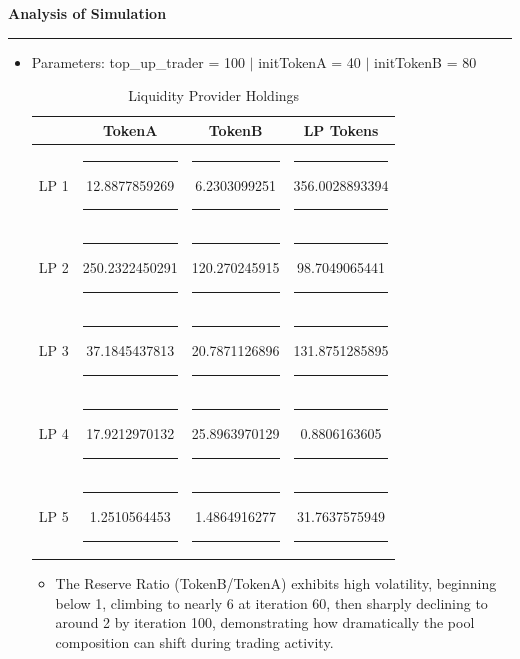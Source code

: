 \documentclass[a4paper]{article}
\newenvironment{solution}[2][]{%
\begin{mdframed}[linecolor=blue!70!black, linewidth=2pt, roundcorner=10pt, backgroundcolor=yellow!10!white, skipabove=12pt, skipbelow=12pt]%
	\textbf{\large #2}
	\par\noindent\rule{\textwidth}{0.4pt}
}{
\end{mdframed}
}
\begin{document}
\begin{solution}{Analysis of Simulation}
\begin{itemize}
\item Parameters: top\_up\_trader = 100 $|$ initTokenA = 40 $|$ initTokenB = 80 
\begin{figure}[H]
   \centering
\end{figure}

\begin{table}[H]
	\centering
	\begin{tabular}{|c|c|c|c|}
	\hline
	\textbf{\rule{0pt}{1.2em}Liquidity Provider} & \textbf{TokenA} & \textbf{TokenB} & \textbf{LP Tokens} \\ \hline
	LP 1 & \rule{0.5em}{0pt}12.8877859269\rule{0.5em}{0pt} & \rule{0.5em}{0pt}6.2303099251\rule{0.5em}{0pt} & \rule{0.5em}{0pt}356.0028893394\rule{0.5em}{0pt} \\ \hline
	LP 2 & \rule{0.5em}{0pt}250.2322450291\rule{0.5em}{0pt} & \rule{0.5em}{0pt}120.270245915\rule{0.5em}{0pt} & \rule{0.5em}{0pt}98.7049065441\rule{0.5em}{0pt} \\ \hline
	LP 3 & \rule{0.5em}{0pt}37.1845437813\rule{0.5em}{0pt} & \rule{0.5em}{0pt}20.7871126896\rule{0.5em}{0pt} & \rule{0.5em}{0pt}131.8751285895\rule{0.5em}{0pt} \\ \hline
	LP 4 & \rule{0.5em}{0pt}17.9212970132\rule{0.5em}{0pt} & \rule{0.5em}{0pt}25.8963970129\rule{0.5em}{0pt} & \rule{0.5em}{0pt}0.8806163605\rule{0.5em}{0pt} \\ \hline
	LP 5 & \rule{0.5em}{0pt}1.2510564453\rule{0.5em}{0pt} & \rule{0.5em}{0pt}1.4864916277\rule{0.5em}{0pt} & \rule{0.5em}{0pt}31.7637575949\rule{0.5em}{0pt} \\ \hline
	\end{tabular}
	\caption{Liquidity Provider Holdings}
\end{table}
\begin{itemize}
	\item The Reserve Ratio (TokenB/TokenA) exhibits high volatility, beginning below 1, climbing to nearly 6 at iteration 60, then sharply declining to around 2 by iteration 100, demonstrating how dramatically the pool composition can shift during trading activity.


\end{itemize}
\end{itemize}
\end{solution}
\end{document}
